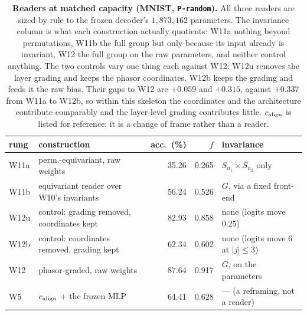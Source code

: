 \begin{table}[t]
\centering\small
\caption{\textbf{Readers at matched capacity (MNIST, \texttt{P-random}).} All three readers are sized by rule to the frozen decoder's $1{,}873{,}162$ parameters. The invariance column is what each construction actually quotients: W11a nothing beyond permutations, W11b the full group but only because its input already is invariant, W12 the full group on the raw parameters, and neither control anything. The two controls vary one thing each against W12: W12u removes the layer grading and keeps the phasor coordinates, W12b keeps the grading and feeds it the raw bias. Their gaps to W12 are $+0.059$ and $+0.315$, against $+0.337$ from W11a to W12b, so within this skeleton the coordinates and the architecture contribute comparably and the layer-level grading contributes little. $c_{\mathrm{align}}$ is listed for reference; it is a change of frame rather than a reader.}
\label{tab:w12}
\begin{tabular}{@{}llrrl@{}}
\toprule
rung & construction & acc.\ (\%) & $f$ & invariance \\
\midrule
W11a & perm.-equivariant, raw weights & 35.26 & 0.265 & $S_{n_1}\times S_{n_2}$ only \\
W11b & equivariant reader over W10's invariants & 56.24 & 0.526 & $G$, via a fixed front-end \\
W12u & \quad control: grading removed, coordinates kept & 82.93 & 0.858 & none (logits move $0.25$) \\
W12b & \quad control: coordinates removed, grading kept & 62.34 & 0.602 & none (logits move $6$ at $|j|\le3$) \\
W12 & phasor-graded, raw weights & 87.64 & 0.917 & $G$, on the parameters \\
W5 & $c_{\mathrm{align}}$ + the frozen MLP & 64.41 & 0.628 & --- (a reframing, not a reader) \\
\bottomrule
\end{tabular}
\end{table}
